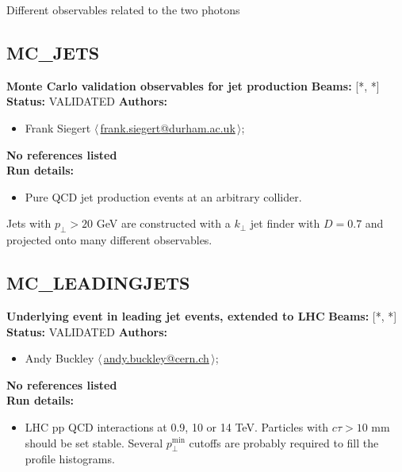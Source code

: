 \noindent Different observables related to the two photons

\clearpage


\clearpage

\subsection{MC\_JETS}
\textbf{Monte Carlo validation observables for jet production}\newline
\textbf{Beams:} [*, *] \newline
\textbf{Status:} VALIDATED\newline
\textbf{Authors:}
\begin{itemize}
  \item Frank Siegert $\langle\,$\href{mailto:frank.siegert@durham.ac.uk}{frank.siegert@durham.ac.uk}$\,\rangle$;
\end{itemize}
\textbf{No references listed}\\ 
\textbf{Run details:}
\begin{itemize}

  \item Pure QCD jet production events at an arbitrary collider.\end{itemize}

\noindent Jets with $p_\perp>20$ GeV are constructed with a $k_\perp$ jet finder with $D=0.7$ and projected onto many different observables.

\clearpage


\clearpage

\subsection{MC\_LEADINGJETS}
\textbf{Underlying event in leading jet events, extended to LHC}\newline
\textbf{Beams:} [*, *] \newline
\textbf{Status:} VALIDATED\newline
\textbf{Authors:}
\begin{itemize}
  \item Andy Buckley $\langle\,$\href{mailto:andy.buckley@cern.ch}{andy.buckley@cern.ch}$\,\rangle$;
\end{itemize}
\textbf{No references listed}\\ 
\textbf{Run details:}
\begin{itemize}

  \item LHC pp QCD interactions at 0.9, 10 or 14 TeV. Particles with $c \tau > 10$ mm should be set stable. Several $p_\perp^\text{min}$ cutoffs are probably required to fill the profile histograms.\end{itemize}


